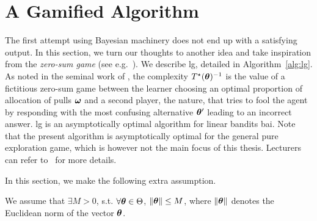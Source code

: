 \section{A Gamified Algorithm}\label{sec:lgc.game}

The first attempt using Bayesian machinery does not end up with a satisfying output. In this section, we turn our thoughts to another idea and take inspiration from the \emph{zero-sum game} (see e.g.~\citealt{degenne2019pure}). We describe \gls{lg}, detailed in Algorithm~\ref{alg:lg}. As noted in the seminal work of \citet{chernoff1959}, the complexity $T^{\star}({\boldsymbol \theta})^{-1}$ is the value of a fictitious zero-sum game between the learner choosing an optimal proportion of allocation of pulls ${\boldsymbol \omega}$ and a second player, the nature, that tries to fool the agent by responding with the most confusing alternative ${\boldsymbol \theta}'$ leading to an incorrect answer. \gls{lg} is an asymptotically optimal algorithm for linear bandits \gls{bai}. Note that the present algorithm is asymptotically optimal for the general pure exploration game, which is however not the main focus of this thesis. Lecturers can refer to~\cite{degenne2020game} for more details.

In this section, we make the following extra assumption.
\begin{assumption}\label{ass:lgc.bounded_parameter}
\begin{leftbar}[assumptionbar]
We assume that $\exists M>0$, s.t. $\forall {\boldsymbol \theta}\in\Theta$, $\left\lVert{\boldsymbol \theta}\right\rVert \leq M$, where $\left\lVert{\boldsymbol \theta}\right\rVert$ denotes the Euclidean norm of the vector ${\boldsymbol \theta}$. 
\end{leftbar}
\end{assumption}






